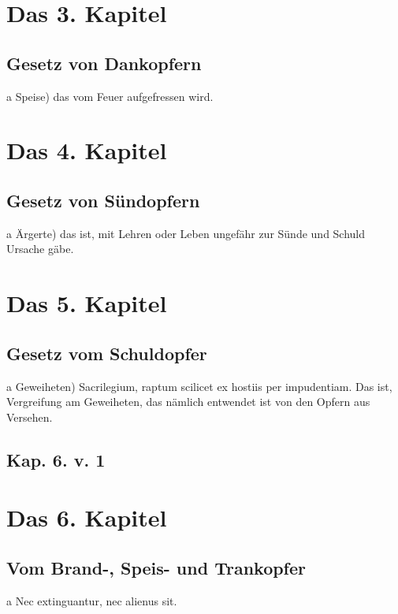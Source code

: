 \chapter{Das 3. Kapitel}

\section{Gesetz von Dankopfern}

a Speise) das vom Feuer aufgefressen wird.

\chapter{Das 4. Kapitel}

\section{Gesetz von Sündopfern}

a Ärgerte) das ist, mit Lehren oder Leben ungefähr zur Sünde und Schuld Ursache gäbe.

\chapter{Das 5. Kapitel}

\section{Gesetz vom Schuldopfer}

a Geweiheten) Sacrilegium, raptum scilicet ex hostiis per impudentiam. Das ist, Vergreifung am Geweiheten, das nämlich entwendet ist von den Opfern aus Versehen.

\section{Kap. 6. v. 1}

\chapter{Das 6. Kapitel}

\section{Vom Brand-, Speis- und Trankopfer}

a Nec extinguantur, nec alienus sit.

